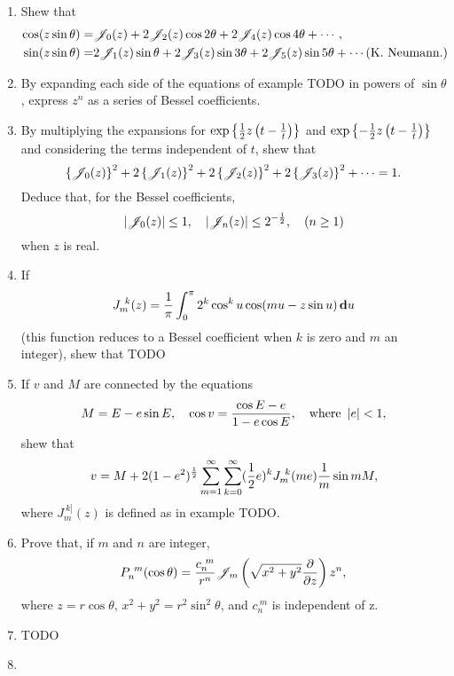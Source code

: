 \documentclass{book}
\begin{document}
%
%
\miscexamples
\begin{enumerate}
\item Shew that
  \begin{align*}
    \cos(z \sin\theta)
    =& \besJ_{0}(z) + 2 \besJ_{2}(z) \cos 2\theta + 2 \besJ_{4}(z)
    \cos 4\theta + \cdots,
    \\
    \sin(z\sin\theta)
    =& 2\besJ_{1}(z) \sin\theta + 2 \besJ_{3}(z)\sin 3\theta + 2
    \besJ_{5}(z) \sin 5\theta + \cdots
    \addexamplecitation{K. Neumann.}
  \end{align*}
\item
  By expanding each side of the equations of example TODO in powers of
  $\sin\theta$, express $z^n$ as a series of Bessel coefficients.
\item
  By multiplying the expansions for
  $\exp{ \left\{  \frac{1}{2} z\left( t - \frac{1}{t} \right)  \right\}  }$
  and
  $\exp{ \left\{ - \frac{1}{2} z\left( t - \frac{1}{t} \right)  \right\}  }$
  and considering the terms independent of $t$, shew that
  $$
  \left\{  \mathscr{J}_{0}(z)  \right\}^2
  + 2 \left\{  \mathscr{J}_{1}(z)  \right\}^2
  + 2 \left\{  \mathscr{J}_{2}(z)  \right\}^2
  + 2 \left\{  \mathscr{J}_{3}(z)  \right\}^2
  +
  \cdots
  =
  1.
  $$
  Deduce that, for the Bessel coefficients,
  $$
  \left| \mathscr{J}_{0}(z) \right| \leq 1,
  \quad
  \left| \mathscr{J}_{n}(z) \right| \leq 2^{-\frac{1}{2}},
  \quad
  (n \geq 1)
  $$
  when $z$ is real.
\item
  If
  $$
  J_{m}^{\ k}(z)
  =
  \frac{1}{\pi}
  \int_{0}^{\pi}
  2^{k}
  \cos^{k} u
  \cos (mu - z\sin u)
  \, \mathbf{d} u
  $$
  (this function reduces to a Bessel coefficient when $k$ is zero and
  $m$ an integer), shew that
  TODO
\item
  If $v$ and $M$ are connected by the equations
  $$
  M = E - e \sin E,
  \quad
  \cos v = \frac{\cos E - e}{1 - e\cos E},
  \quad
  \text{where } \left| e \right| < 1,
  $$
  shew that
  $$
  v
  =
  M
  +
  2 (1-e^{2})^{\frac{1}{2}}
  \sum_{m=1}^{\infty}
  \sum_{k=0}^{\infty}
  (\frac{1}{2} e)^{k}
  J_{m}^{\ k}(me)
  \frac{1}{m}
  \sin mM,
  $$
  where $J_{m}^{\ k]}(z)$ is defined as in example TODO.
\item
  Prove that, if $m$ and $n$ are integer,
  $$
  P_{n}^{\ m}(\cos\theta)
  =
  \frac{c_{n}^{\ m}}{r^{n}}
  \mathscr{J}_{m}
  \left(  \sqrt{x^{2}+y^{2}} \frac{\partial}{\partial z} \right)
  z^{n},
  $$
  where $z = r\cos\theta$, $x^{2} + y^{2} = r^{2} \sin^{2}\theta$, and
  $c_{n}^{\ m}$ is independent of z.
\item
  TODO
\item

\end{enumerate}
\end{document}
